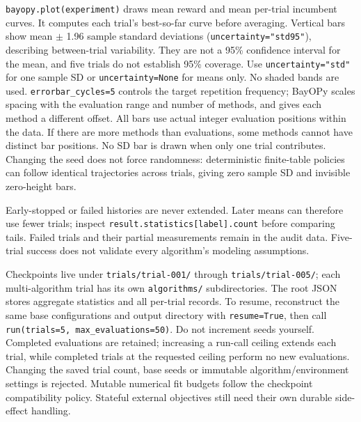 \documentclass[10pt,a4paper]{article}
\begin{document}
\texttt{bayopy.\allowbreak{}plot(experiment)} draws mean reward and mean per-trial incumbent curves. It computes each trial's best-so-far curve before averaging. Vertical bars show mean \ensuremath{\pm} 1.96 sample standard deviations (\texttt{uncertainty=\allowbreak{}"std95"}),\allowbreak{} describing between-trial variability. They are not a 95\% confidence interval for the mean,\allowbreak{} and five trials do not establish 95\% coverage. Use \texttt{uncertainty=\allowbreak{}"std"} for one sample SD or \texttt{uncertainty=\allowbreak{}None} for means only. No shaded bands are used. \texttt{errorbar\_\allowbreak{}cycles=\allowbreak{}5} controls the target repetition frequency; BayOPy scales spacing with the evaluation range and number of methods,\allowbreak{} and gives each method a different offset. All bars use actual integer evaluation positions within the data. If there are more methods than evaluations,\allowbreak{} some methods cannot have distinct bar positions. No SD bar is drawn when only one trial contributes. Changing the seed does not force randomness: deterministic finite-table policies can follow identical trajectories across trials,\allowbreak{} giving zero sample SD and invisible zero-height bars.


Early-stopped or failed histories are never extended. Later means can therefore use fewer trials; inspect \texttt{result.\allowbreak{}statistics[label].\allowbreak{}count} before comparing tails. Failed trials and their partial measurements remain in the audit data. Five-trial success does not validate every algorithm's modeling assumptions.


Checkpoints live under \texttt{trials/\allowbreak{}trial-001/\allowbreak{}} through \texttt{trials/\allowbreak{}trial-005/\allowbreak{}}; each multi-algorithm trial has its own \texttt{algorithms/\allowbreak{}} subdirectories. The root JSON stores aggregate statistics and all per-trial records. To resume,\allowbreak{} reconstruct the same base configurations and output directory with \texttt{resume=\allowbreak{}True},\allowbreak{} then call \texttt{run(trials=\allowbreak{}5,\allowbreak{} max\_\allowbreak{}evaluations=\allowbreak{}50)}. Do not increment seeds yourself. Completed evaluations are retained; increasing a run-call ceiling extends each trial,\allowbreak{} while completed trials at the requested ceiling perform no new evaluations. Changing the saved trial count,\allowbreak{} base seeds or immutable algorithm/environment settings is rejected. Mutable numerical fit budgets follow the checkpoint compatibility policy. Stateful external objectives still need their own durable side-effect handling.
\end{document}
